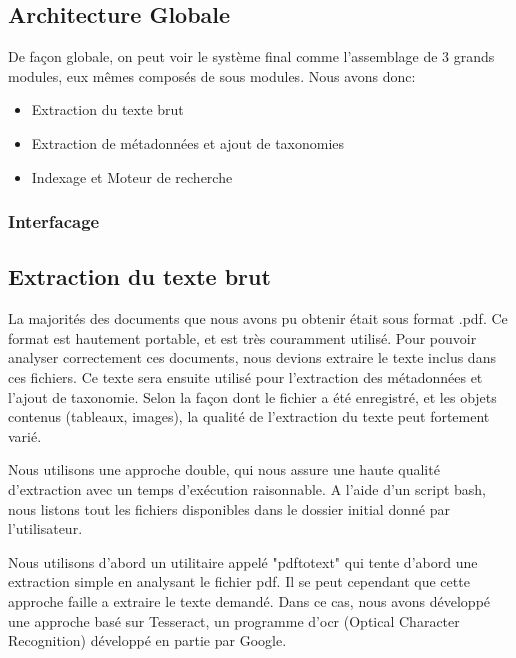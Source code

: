 

\subsection{Architecture Globale}
De façon globale, on peut voir le système final comme l'assemblage de 3 grands modules, eux mêmes composés de sous modules. 
Nous avons donc:
\begin{itemize}
	\item Extraction du texte brut
	\item Extraction de métadonnées et ajout de taxonomies
	\item Indexage et Moteur de recherche
\end{itemize}

\subsubsection{Interfacage}

\subsection{Extraction du texte brut}
La majorités des documents que nous avons pu obtenir était sous format .pdf.
Ce format est hautement portable, et est très couramment utilisé.
Pour pouvoir analyser correctement ces documents, nous devions extraire le texte inclus dans ces fichiers.
Ce texte sera ensuite utilisé pour l'extraction des métadonnées et l'ajout de taxonomie. Selon la façon dont le fichier a été enregistré, et les objets contenus (tableaux, images), la qualité de l'extraction du texte peut fortement varié. 

Nous utilisons une approche double, qui nous assure une haute qualité d'extraction avec un temps d'exécution raisonnable.
A l'aide d'un script bash, nous listons tout les fichiers disponibles dans le dossier initial donné par l'utilisateur. 

Nous utilisons d'abord un utilitaire appelé "pdftotext" qui tente d'abord une extraction simple en analysant le fichier pdf. Il se peut cependant que cette approche faille a extraire le texte demandé. Dans ce cas, nous avons développé une approche basé sur Tesseract, un programme d'\gls{ocr} (Optical Character Recognition) développé en partie par Google. 

